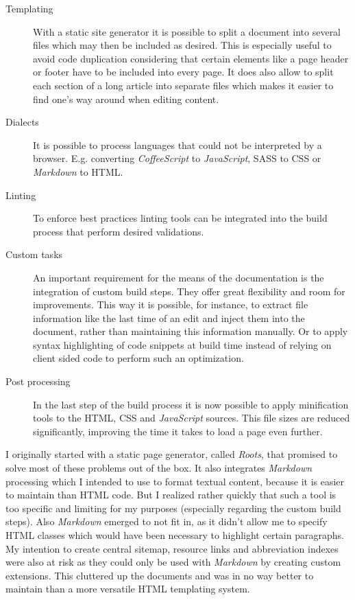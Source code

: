 \begin{description}

	\item[Templating]\hfill

	With a static site generator it is possible to split a document into several files which may then be included as desired. This is especially useful to avoid code duplication considering that certain elements like a page header or footer have to be included into every page. It does also allow to split each section of a long article into separate files which makes it easier to find one's way around when editing content.

	\item[Dialects]\hfill

	It is possible to process languages that could not be interpreted by a browser. E.g. converting \textit{CoffeeScript} to \textit{JavaScript}, \ac{SASS} to \ac{CSS} or \textit{Markdown} to \ac{HTML}.

	\item[Linting]\hfill

	To enforce best practices linting tools can be integrated into the build process that perform desired validations.

	\item[Custom tasks]\hfill

	An important requirement for the means of the documentation is the integration of custom build steps. They offer great flexibility and room for improvements. This way it is possible, for instance, to extract file information like the last time of an edit and inject them into the document, rather than maintaining this information manually. Or to apply syntax highlighting of code snippets at build time instead of relying on client sided code to perform such an optimization.

	\item[Post processing]\hfill

	In the last step of the build process it is now possible to apply minification tools to the \ac{HTML}, \ac{CSS} and \textit{JavaScript} sources. This file sizes are reduced significantly, improving the time it takes to load a page even further.

\end{description}

I originally started with a static page generator, called \textit{Roots}, that promised to solve most of these problems out of the box. It also integrates \textit{Markdown} processing which I intended to use to format textual content, because it is easier to maintain than \ac{HTML} code. But I realized rather quickly that such a tool is too specific and limiting for my purposes (especially regarding the custom build steps). Also \textit{Markdown} emerged to not fit in, as it didn't allow me to specify \ac{HTML} classes which would have been necessary to highlight certain paragraphs. My intention to create central sitemap, resource links and abbreviation indexes were also at risk as they could only be used with \textit{Markdown} by creating custom extensions. This cluttered up the documents and was in no way better to maintain than a more versatile \ac{HTML} templating system.

